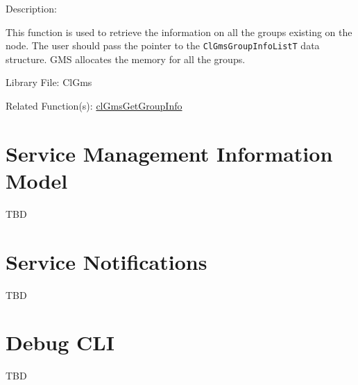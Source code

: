 \begin{flushleft}
\begin{Desc}
\begin{description}
  \end{description}
   \end{Desc}

  \begin{Desc}
  \item[Description:]

  This function is used to retrieve the information on all the groups existing on the node.
  The user should pass the pointer to the {\tt{ClGmsGroupInfoListT}} data structure. GMS
  allocates the memory for all the groups.
 \end{Desc}
 \begin{Desc}
\item[Library File:]Cl\-Gms\end{Desc}
\begin{Desc}
  \item[Related Function(s):] \hyperlink{pagegms109}{clGmsGetGroupInfo}
  \end{Desc}
\end{flushleft}


\chapter{Service Management Information Model}
TBD


\chapter{Service Notifications}
TBD


\chapter{Debug CLI}
TBD
